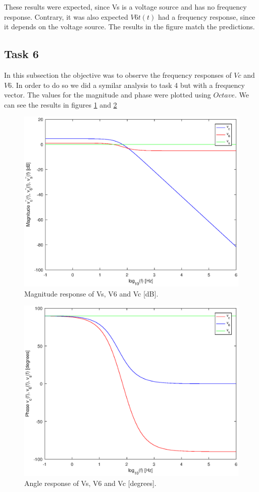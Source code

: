 \par These results were expected, since Vs is a voltage source and has no frequency response. Contrary, it was also expected $V6t(t)$ had a frequency response, since it depends on the voltage source. The results in the figure match the predictions.

\newpage

\subsection{Task 6}
\par In this subsection the objective was to observe the frequency responses of $Vc$ and $V6$. In order to do so we did a symilar analysis to task 4 but with a frequency vector. The values for the magnitude and phase were plotted using $Octave$. We can see the results in figures \ref{fig:g6_1} and  \ref{fig:g6_2}


\begin{figure}[h] \centering
\includegraphics[width=0.8\linewidth]{magnitude.eps}
\caption{Magnitude response of Vs, V6 and Vc [dB].}
\label{fig:g6_1}
\end{figure}


\begin{figure}[h] \centering
\includegraphics[width=0.8\linewidth]{phase.eps}
\caption{Angle response of Vs, V6 and Vc [degrees].}
\label{fig:g6_2}
\end{figure}

